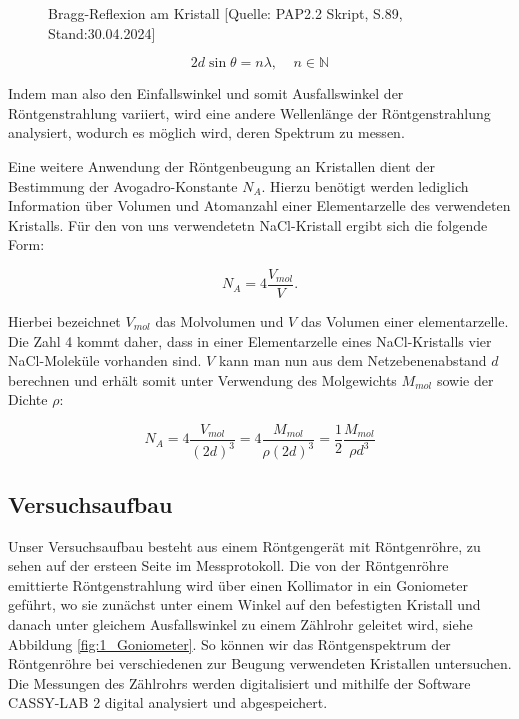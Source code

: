 \documentclass{article}
\begin{document}
\begin{figure}[!b]
    \centering
    \caption{Bragg-Reflexion am Kristall [Quelle: PAP2.2 Skript, S.89, Stand:30.04.2024]}
    \label{fig:1_Bragg}
\end{figure}


\begin{equation}
    2 d \sin \theta = n \lambda, \ \ \ \ \ n \in \mathbb{N}
    \label{eq:1_BRAGG}
\end{equation}

Indem man also den Einfallswinkel und somit Ausfallswinkel der Röntgenstrahlung variiert, wird eine andere Wellenlänge der Röntgenstrahlung analysiert, wodurch es möglich wird, deren Spektrum zu messen. 

Eine weitere Anwendung der Röntgenbeugung an Kristallen dient der Bestimmung der Avogadro-Konstante $N_A$. Hierzu benötigt werden lediglich Information über Volumen und Atomanzahl einer Elementarzelle des verwendeten Kristalls. Für den von uns verwendetetn NaCl-Kristall ergibt sich die folgende Form:

\begin{equation}
    N_A = 4 \frac{V_{mol}}{V}.
\end{equation}

Hierbei bezeichnet $V_{mol}$ das Molvolumen und $V$ das Volumen einer elementarzelle. Die Zahl 4 kommt daher, dass in einer Elementarzelle eines NaCl-Kristalls vier NaCl-Moleküle vorhanden sind. $V$ kann man nun aus dem Netzebenenabstand $d$ berechnen und erhält somit unter Verwendung des Molgewichts $M_{mol}$ sowie der Dichte $\rho$:

\begin{equation}
    N_A = 4 \frac{V_{mol}}{(2d)^3} = 4 \frac{M_{mol}}{ \rho (2d)^3} = \frac{1}{2} \frac{M_{mol}}{\rho d^3}
    \label{eq:1_AVOGADRO}
\end{equation}

\newpage
\subsection{Versuchsaufbau}

Unser Versuchsaufbau besteht aus einem Röntgengerät mit Röntgenröhre, zu sehen auf der ersteen Seite im Messprotokoll. Die von der Röntgenröhre emittierte Röntgenstrahlung wird über einen Kollimator in ein Goniometer geführt, wo sie zunächst unter einem Winkel auf den befestigten Kristall und danach unter gleichem Ausfallswinkel zu einem Zählrohr geleitet wird, siehe Abbildung \ref{fig:1_Goniometer}. So können wir das Röntgenspektrum der Röntgenröhre bei verschiedenen zur Beugung verwendeten Kristallen untersuchen. Die Messungen des Zählrohrs werden digitalisiert und mithilfe der Software CASSY-LAB 2 digital analysiert und abgespeichert. 
\end{document}
